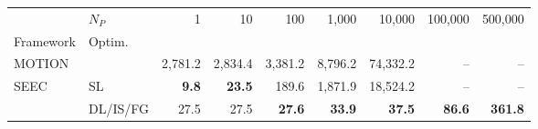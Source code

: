 \begin{tabular}{llrrrrrrr}
\toprule
 & $N_P$ & 1 & 10 & 100 & 1,000 & 10,000 & 100,000 & 500,000 \\
Framework & Optim. &  &  &  &  &  &  &  \\
\midrule
MOTION~\cite{BDST22} &  & 2,781.2 & 2,834.4 & 3,381.2 & 8,796.2 & 74,332.2 & -- & -- \\
\cline{1-9}
\multirow[c]{2}{*}{SEEC} & SL & \bfseries 9.8 & \bfseries 23.5 & 189.6 & 1,871.9 & 18,524.2 & -- & -- \\
 & DL/IS/FG & 27.5 & 27.5 & \bfseries 27.6 & \bfseries 33.9 & \bfseries 37.5 & \bfseries 86.6 & \bfseries 361.8 \\
\bottomrule
\end{tabular}
